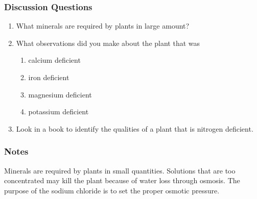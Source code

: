 \subsubsection*{Discussion Questions}
\begin{enumerate}
\item{What minerals are required by plants in large amount?}
\item{What observations did you make about the plant that was} 
\begin{enumerate}
\item{calcium deficient}
\item{iron deficient}
\item{magnesium deficient}
\item{potassium deficient}
\end{enumerate}
\item{Look in a book to identify the qualities of a plant that is nitrogen deficient.}
\end{enumerate}

\subsubsection*{Notes}
Minerals are required by plants in small quantities. Solutions that are too concentrated may kill the plant because of water loss through osmosis. The purpose of the sodium chloride is to set the proper osmotic pressure.
